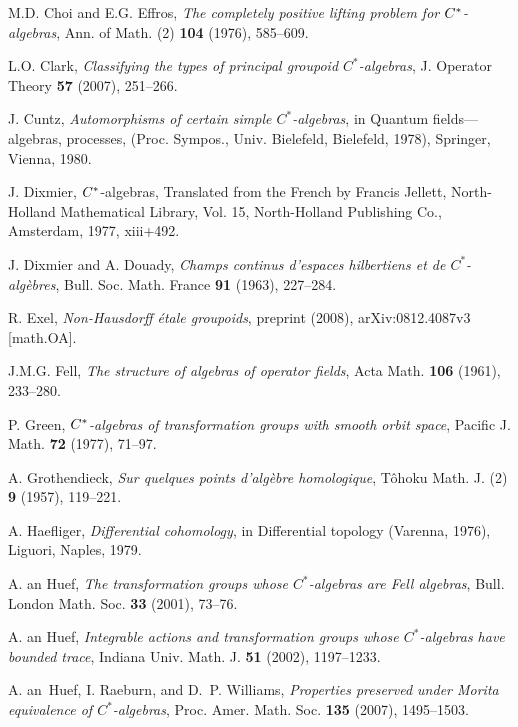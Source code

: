 \documentclass[12pt,a4paper]{amsart}
\begin{document}
\begin{thebibliography}{00}
 M.D. Choi  and E.G. Effros, \emph{The
    completely positive lifting problem for {$C\sp*$}-algebras},
    Ann. of Math. (2) \textbf{104} (1976), 585--609.

 L.O. Clark, \emph{Classifying the types of
    principal groupoid {$C^*$}-algebras}, J. Operator Theory
    \textbf{57} (2007), 251--266.

 J. Cuntz, \emph{Automorphisms of certain simple
    {$C^{\ast} $}-algebras}, in Quantum fields---algebras,
    processes, ({P}roc. {S}ympos., {U}niv. {B}ielefeld,
    {B}ielefeld, 1978), Springer, Vienna, 1980.

 J. Dixmier, {$C\sp*$}-algebras, Translated from
    the French by Francis Jellett, North-Holland Mathematical
    Library, Vol. 15, North-Holland Publishing Co., Amsterdam,
    1977, xiii+492.

 J. Dixmier  and A. Douady, \emph{Champs continus
    d'espaces hilbertiens et de {$C^{\ast} $}-alg\`ebres}, Bull.
    Soc. Math. France \textbf{91} (1963),  227--284.

 R. Exel, \emph{Non-Hausdorff \'etale
    groupoids}, preprint (2008), 	arXiv:0812.4087v3  [math.OA].


 J.M.G. Fell, \emph{The structure of algebras of
    operator fields}, Acta Math. \textbf{106} (1961),  233--280.

 P. Green, \emph{{$C\sp*$}-algebras of transformation
    groups with smooth orbit space}, Pacific J. Math.
    \textbf{72} (1977), 71--97.

 A. Grothendieck, \emph{Sur quelques
    points d'alg\`ebre homologique}, T\^ohoku Math. J. (2)
    \textbf{9} (1957),  119--221.

    A. Haefliger,  \emph{Differential cohomology}, in Differential topology (Varenna, 1976), Liguori, Naples, 1979.


     A. an Huef, \emph{The transformation groups whose
    {$C^*$}-algebras are {F}ell algebras}, Bull. London Math.
    Soc. \textbf{33} (2001), 73--76.

 A. an Huef, \emph{Integrable actions and
    transformation groups whose {$C^\ast$}-algebras have bounded
    trace}, Indiana Univ. Math. J. \textbf{51} (2002),
    1197--1233.

 A. an~Huef, I. Raeburn, and D.~P. Williams,
    \emph{Properties preserved under {M}orita equivalence of
    {$C^*$}-algebras}, Proc. Amer. Math. Soc. \textbf{135}
    (2007), 1495--1503.


\end{thebibliography}
\end{document}
